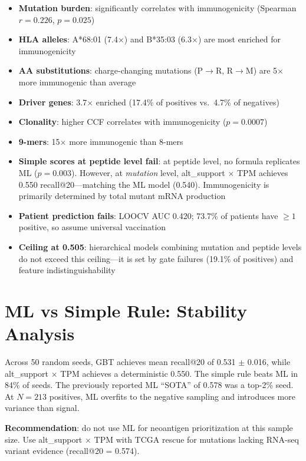\documentclass[11pt,twocolumn]{article}
\begin{document}
\begin{itemize}[nosep]
\item \textbf{Mutation burden}: significantly correlates with immunogenicity
(Spearman $r = 0.226$, $p = 0.025$)
\item \textbf{HLA alleles}: A*68:01 (7.4$\times$) and B*35:03
(6.3$\times$) are most enriched for immunogenicity
\item \textbf{AA substitutions}: charge-changing mutations (P$\to$R,
R$\to$M) are 5$\times$ more immunogenic than average
\item \textbf{Driver genes}: 3.7$\times$ enriched (17.4\% of positives
vs.\ 4.7\% of negatives)
\item \textbf{Clonality}: higher CCF correlates with immunogenicity
($p = 0.0007$)
\item \textbf{9-mers}: 15$\times$ more immunogenic than 8-mers
\item \textbf{Simple scores at peptide level fail}: at peptide level,
no formula replicates ML ($p = 0.003$). However, at \textit{mutation}
level, alt\_support $\times$ TPM achieves 0.550 recall@20---matching
the ML model (0.540). Immunogenicity is primarily determined by
total mutant mRNA production
\item \textbf{Patient prediction fails}: LOOCV AUC 0.420; 73.7\%
of patients have $\geq 1$ positive, so assume universal vaccination
\item \textbf{Ceiling at 0.505}: hierarchical models combining mutation
and peptide levels do not exceed this ceiling---it is set by gate failures
(19.1\% of positives) and feature indistinguishability
\end{itemize}

\section{ML vs Simple Rule: Stability Analysis}

Across 50 random seeds, GBT achieves mean recall@20 of 0.531 $\pm$ 0.016,
while alt\_support $\times$ TPM achieves a deterministic 0.550. The simple
rule beats ML in 84\% of seeds. The previously reported ML ``SOTA'' of
0.578 was a top-2\% seed. At $N=213$ positives, ML overfits to the
negative sampling and introduces more variance than signal.

\textbf{Recommendation}: do not use ML for neoantigen prioritization
at this sample size. Use alt\_support $\times$ TPM with TCGA rescue
for mutations lacking RNA-seq variant evidence (recall@20 = 0.574).
\end{document}
